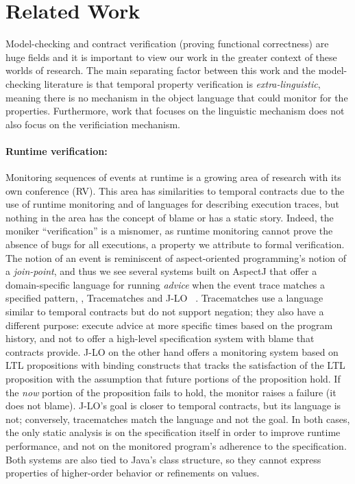 \section{Related Work}

Model-checking and contract verification (proving functional correctness) are huge fields and it is important to view our work in the greater context of these worlds of research.
%
The main separating factor between this work and the model-checking literature is that temporal property verification is \emph{extra-linguistic}, meaning there is no mechanism in the object language that could monitor for the properties.
%
Furthermore, work that focuses on the linguistic mechanism does not also focus on the verificiation mechanism.

\paragraph{Runtime verification:}
Monitoring sequences of events at runtime is a growing area of research with its own conference (RV).
%
This area has similarities to temporal contracts due to the use of runtime monitoring and of languages for describing execution traces, but nothing in the area has the concept of blame or has a static story.
%
Indeed, the moniker ``verification'' is a misnomer, as runtime monitoring cannot prove the absence of bugs for all executions, a property we attribute to formal verification.
%
The notion of an event is reminiscent of aspect-oriented programming's notion of a \emph{join-point}, and thus we see several systems built on AspectJ \citep{ianjohnson:aspectj} that offer a domain-specific language for running \emph{advice} when the event trace matches a specified pattern, \eg, Tracematches \citep{ianjohnson:Allan05addingtrace} and J-LO ~\citep{ianjohnson:jlo}.
%
Tracematches use a language similar to temporal contracts but do not support negation; they also have a different purpose: execute advice at more specific times based on the program history, and not to offer a high-level specification system with blame that contracts provide.
%
J-LO on the other hand offers a monitoring system based on LTL propositions with binding constructs that tracks the satisfaction of the LTL proposition with the assumption that future portions of the proposition hold.
%
If the \emph{now} portion of the proposition fails to hold, the monitor raises a failure (it does not blame).
%
J-LO's goal is closer to temporal contracts, but its language is not; conversely, tracematches match the language and not the goal.
%
In both cases, the only static analysis is on the specification itself in order to improve runtime performance, and not on the monitored program's adherence to the specification.
%
Both systems are also tied to Java's class structure, so they cannot express properties of higher-order behavior or refinements on values.

